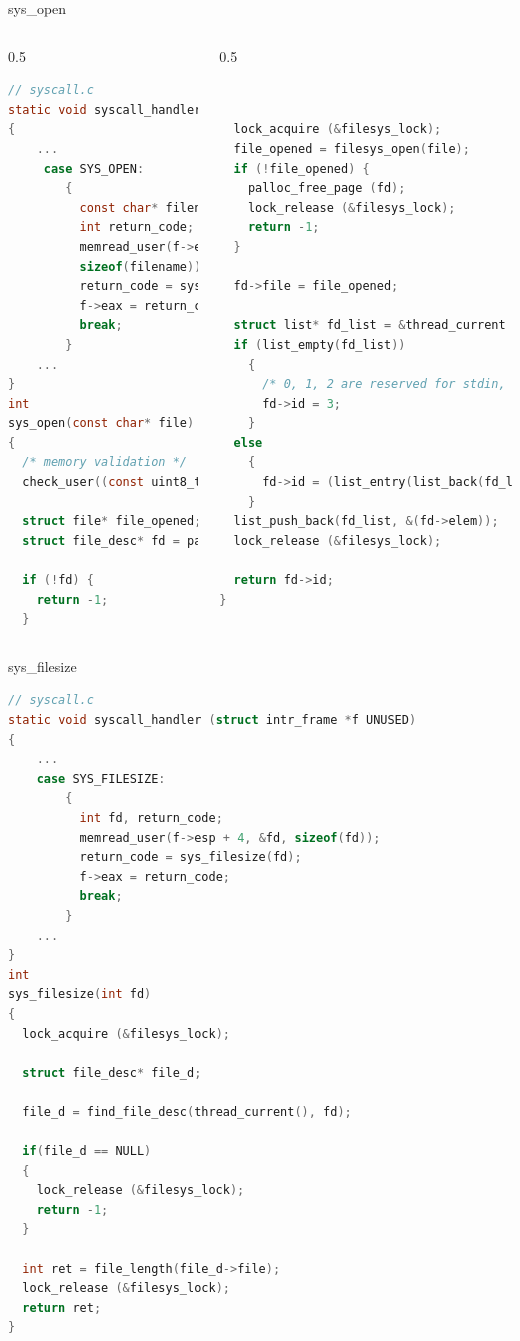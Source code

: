\documentclass[10pt]{beamer}
\begin{document}
\begin{frame}[fragile]{sys\_open}
\begin{columns}
\begin{column}{0.5\textwidth}
\begin{lstlisting}[language=C]
// syscall.c
static void syscall_handler (struct intr_frame *f ) 
{
    ...
     case SYS_OPEN:
        {
          const char* filename;
          int return_code;
          memread_user(f->esp + 4, &filename,
          sizeof(filename));
          return_code = sys_open(filename);
          f->eax = return_code;
          break;
        }
    ...
}
int 
sys_open(const char* file) 
{
  /* memory validation */
  check_user((const uint8_t*) file);
  
  struct file* file_opened;
  struct file_desc* fd = palloc_get_page(0);

  if (!fd) {
    return -1;
  }
\end{lstlisting}
\end{column}
\begin{column}{0.5\textwidth}
\begin{lstlisting}[language=C]


  lock_acquire (&filesys_lock);
  file_opened = filesys_open(file);
  if (!file_opened) {
    palloc_free_page (fd);
    lock_release (&filesys_lock);
    return -1;
  }

  fd->file = file_opened;

  struct list* fd_list = &thread_current ()->file_descriptors;
  if (list_empty(fd_list)) 
    {
      /* 0, 1, 2 are reserved for stdin, stdout, stderr. */
      fd->id = 3;
    }
  else 
    {
      fd->id = (list_entry(list_back(fd_list), struct file_desc, elem)->id) + 1;
    }
  list_push_back(fd_list, &(fd->elem));
  lock_release (&filesys_lock);

  return fd->id;
}
\end{lstlisting}
\end{column}
\end{columns}
\end{frame}
\begin{frame}[fragile]{sys\_filesize}
    \begin{lstlisting}[language=C]
// syscall.c
static void syscall_handler (struct intr_frame *f UNUSED) 
{
    ...
    case SYS_FILESIZE:
        {
          int fd, return_code;
          memread_user(f->esp + 4, &fd, sizeof(fd));
          return_code = sys_filesize(fd);
          f->eax = return_code;
          break;
        }
    ...
}
int 
sys_filesize(int fd) 
{
  lock_acquire (&filesys_lock);

  struct file_desc* file_d;

  file_d = find_file_desc(thread_current(), fd);

  if(file_d == NULL) 
  {
    lock_release (&filesys_lock);
    return -1;
  }

  int ret = file_length(file_d->file);
  lock_release (&filesys_lock);
  return ret;
}
    \end{lstlisting}
\end{frame}
\end{document}
